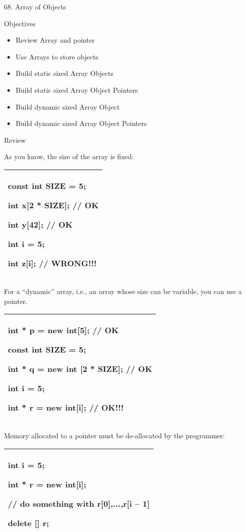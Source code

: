 \documentclass[
]{article}
\author{}
\date{}
\providecommand{\tightlist}{%
  \setlength{\itemsep}{0pt}\setlength{\parskip}{0pt}}
\begin{document}
­68. Array of Objects

Objectives

\begin{itemize}
\tightlist
\item
  Review Array and pointer
\item
  Use Arrays to store objects
\item
  Build static sized Array Objects
\item
  Build static sized Array Object Pointers
\item
  Build dynamic sized Array Object
\item
  Build dynamic sized Array Object Pointers
\end{itemize}

Review

As you know, the size of the array is fixed:

\begin{longtable}[]{@{}l@{}}
\toprule
\endhead
\begin{minipage}[t]{0.97\columnwidth}\raggedright
const int SIZE = 5;

int x{[}2 * SIZE{]}; // OK

int y{[}42{]}; // OK

int i = 5;

int z{[}i{]}; // WRONG!!!\strut
\end{minipage}\tabularnewline
\bottomrule
\end{longtable}

For a ``dynamic'' array, i.e., an array whose size can be variable, you
can use a pointer.

\begin{longtable}[]{@{}l@{}}
\toprule
\endhead
\begin{minipage}[t]{0.97\columnwidth}\raggedright
int * p = new int{[}5{]}; // OK

const int SIZE = 5;

int * q = new int {[}2 * SIZE{]}; // OK

int i = 5;

int * r = new int{[}i{]}; // OK!!!\strut
\end{minipage}\tabularnewline
\bottomrule
\end{longtable}

Memory allocated to a pointer must be de-allocated by the programmer:

\begin{longtable}[]{@{}l@{}}
\toprule
\endhead
\begin{minipage}[t]{0.97\columnwidth}\raggedright
int i = 5;

int * r = new int{[}i{]};

// do something with r{[}0{]},...,r{[}i -- 1{]}

delete {[}{]} r;\strut
\end{minipage}\tabularnewline
\bottomrule
\end{longtable}
\end{document}
